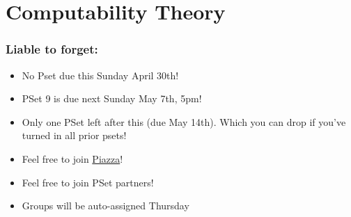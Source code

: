 


\setcounter{section}{8} 

\section{Computability Theory}

\begin{frame}

\scriptsize{\tableofcontents}

\end{frame}



\begin{frame}
\frametitle{Liable to forget:}

\begin{itemize}[<+->]


\item No Pset due this Sunday April 30th!

\item PSet 9 is due next Sunday May 7th, 5pm!

\item Only one PSet left after this (due May 14th). Which you can drop if you've turned in all prior psets! 

\item Feel free to join \href{https://piazza.com/mit/spring2023/24118}{Piazza}! 

\item Feel free to join PSet partners!
\item[] Groups will be auto-assigned Thursday 


\end{itemize}
\end{frame}

